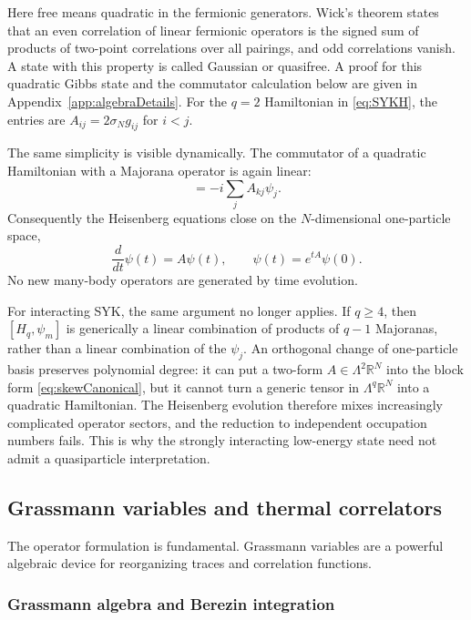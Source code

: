 \documentclass[11pt]{article}
\numberwithin{equation}{section}
\theoremstyle{exposition}
\theoremstyle{result}
\newcommand{\R}{\mathbb R}
\begin{document}
Here free means quadratic in the fermionic generators. Wick's theorem states that an even correlation of linear fermionic operators is the signed sum of products of two-point correlations over all pairings, and odd correlations vanish. A state with this property is called Gaussian or quasifree. A proof for this quadratic Gibbs state and the commutator calculation below are given in Appendix~\ref{app:algebraDetails}. For the $q=2$ Hamiltonian in \eqref{eq:SYKH}, the entries are $A_{ij}=2\sigma_Ng_{ij}$ for $i<j$.

The same simplicity is visible dynamically.  The commutator of a quadratic Hamiltonian with a Majorana operator is again linear:
\begin{equation*}
[H_2,\psi_k]=-i\sum_jA_{kj}\psi_j.
\end{equation*}
Consequently the Heisenberg equations close on the $N$-dimensional one-particle space,
\begin{equation*}
\frac{d}{dt}\psi(t)=A\psi(t),
\qquad
\psi(t)=e^{tA}\psi(0).
\end{equation*}
No new many-body operators are generated by time evolution.

For interacting SYK, the same argument no longer applies.  If $q\geq4$, then $[H_q,\psi_m]$ is generically a linear combination of products of $q-1$ Majoranas, rather than a linear combination of the $\psi_j$.  An orthogonal change of one-particle basis preserves polynomial degree: it can put a two-form $A\in\Lambda^2\R^N$ into the block form \eqref{eq:skewCanonical}, but it cannot turn a generic tensor in $\Lambda^q\R^N$ into a quadratic Hamiltonian.  The Heisenberg evolution therefore mixes increasingly complicated operator sectors, and the reduction to independent occupation numbers fails.  This is why the strongly interacting low-energy state need not admit a quasiparticle interpretation.

\subsection[Grassmann algebra and correlators]{Grassmann variables and thermal correlators}

The operator formulation is fundamental. Grassmann variables are a powerful algebraic device for reorganizing traces and correlation functions.

\subsubsection{Grassmann algebra and Berezin integration}
\end{document}
